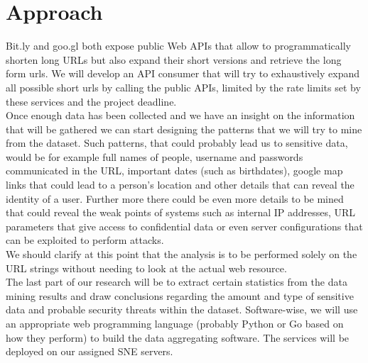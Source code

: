 \documentclass{article}
\begin{document}
\section{Approach}
Bit.ly and goo.gl both expose public Web APIs that allow to programmatically shorten long URLs but also expand their short versions and retrieve the long form urls.\cite{bitlyapi}\cite{googleapi} We will develop an API consumer that will try to exhaustively expand all possible short urls by calling the public APIs, limited by the rate limits set by these services and the project deadline. \\
Once enough data has been collected and we have an insight on the information that will be gathered we can start designing the patterns that we will try to mine from the dataset. Such patterns, that could probably lead us to sensitive data, would be for example full names of people, username and passwords communicated in the URL, important dates (such as birthdates), google map links that could lead to a person's location and other details that can reveal the identity of a user. Further more there could be even more details to be mined that could reveal the weak points of systems such as internal IP addresses, URL parameters that give access to confidential data or even server configurations that can be exploited to perform attacks. \\
We should clarify at this point that the analysis is to be performed solely on the URL strings without needing to look at the actual web resource.\\
The last part of our research will be to extract certain statistics from the data mining results and draw conclusions regarding the amount and type of sensitive data and probable security threats within the dataset. 
Software-wise, we will use an appropriate web programming language (probably Python or Go based on how they perform) to build the data aggregating software. The services will be deployed on our assigned SNE servers.\\
\end{document}
